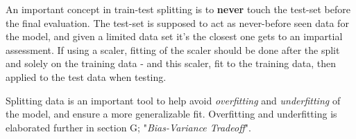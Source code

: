 An important concept in train-test splitting is to \textbf{never} touch the test-set before the final evaluation. The test-set is supposed to act as never-before seen data for the model, and given a limited data set it's the closest one gets to an impartial assessment. 
If using a scaler, fitting of the scaler should be done after the split and solely on the training data - and this scaler, fit to the training data, then applied to the test data when testing. 

Splitting data is an important tool to help avoid \textit{overfitting} and \textit{underfitting} of the model, and ensure a more generalizable fit. Overfitting and underfitting is elaborated further in  section G; "\textit{Bias-Variance Tradeoff}".









